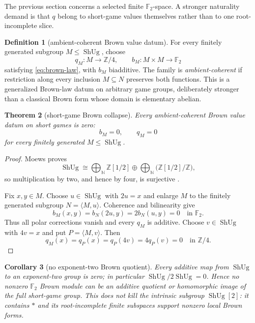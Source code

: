 \documentclass[11pt]{article}
\newtheorem{theorem}{Theorem}
\newtheorem{corollary}[theorem]{Corollary}
\theoremstyle{definition}
\newtheorem{definition}[theorem]{Definition}
\theoremstyle{remark}
\newcommand{\Z}{\mathbb Z}
\newcommand{\F}{\mathbb F}
\newcommand{\ShUg}{\operatorname{ShUg}}
\begin{document}
The previous section concerns a selected finite $\F_2$-space.  A stronger
naturality demand is that $q$ belong to short-game values themselves rather
than to one root-incomplete slice.

\begin{definition}[ambient-coherent Brown value datum]
For every finitely generated subgroup $M\leq\ShUg$, choose
\[
 q_M:M\to\Z/4,
 \qquad b_M:M\times M\to\F_2
\]
satisfying \eqref{eq:brown-law}, with $b_M$ biadditive.  The family is
\emph{ambient-coherent} if restriction along every inclusion $M\subseteq N$
preserves both functions.  This is a generalized Brown-law datum on arbitrary
game groups, deliberately stronger than a classical Brown form whose domain
is elementary abelian.
\end{definition}

\begin{theorem}[short-game Brown collapse]\label{thm:global}
Every ambient-coherent Brown value datum on short games is zero:
\[
 b_M=0,
 \qquad q_M=0
\]
for every finitely generated $M\leq\ShUg$.
\end{theorem}

\begin{proof}
Moews proves
\begin{equation}\label{eq:moews}
 \ShUg\cong\bigoplus_{\mathbb N}\Z[1/2]
 \oplus\bigoplus_{\mathbb N}\bigl(\Z[1/2]/\Z\bigr),
\end{equation}
so multiplication by two, and hence by four, is surjective
\cite[Theorem~9]{moews}.

Fix $x,y\in M$.  Choose $u\in\ShUg$ with $2u=x$ and enlarge $M$ to the
finitely generated subgroup $N=\langle M,u\rangle$.  Coherence and
bilinearity give
\[
 b_M(x,y)=b_N(2u,y)=2b_N(u,y)=0\quad\text{in }\F_2.
\]
Thus all polar corrections vanish and every $q_M$ is additive.  Choose
$v\in\ShUg$ with $4v=x$ and put $P=\langle M,v\rangle$.  Then
\[
 q_M(x)=q_P(x)=q_P(4v)=4q_P(v)=0\quad\text{in }\Z/4.
\]
\end{proof}

\begin{corollary}[no exponent-two Brown quotient]
Every additive map from $\ShUg$ to an exponent-two group is zero;
in particular $\ShUg/2\ShUg=0$.  Hence no nonzero $\F_2$ Brown module can
be an additive quotient or homomorphic image of the full short-game group.
This does not kill the intrinsic subgroup $\ShUg[2]$: it contains $*$ and
its root-incomplete finite subspaces support nonzero local Brown forms.
\end{corollary}
\end{document}
